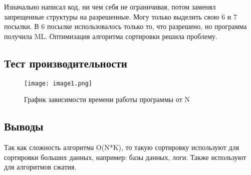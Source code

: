 \documentclass[12pt]{article}
\begin{document}
Изначально написал код, ни чем себя не ограничивая, потом заменял запрещенные структуры на разрешенные. Могу только выделить свою 6 и 7 посылки. В 6 посылке использовалось только то, что разрешено, но программа получила ML. Оптимизация алгоритма сортировки решила проблему.

\subsection*{Тест производительности}

\begin{figure}[H]
    \centering
    \texttt{[image: image1.png]}
    \caption{График зависимости времени работы программы от N}
    \label{fig:graph}
\end{figure}

\subsection*{Выводы}

Так как сложность алгоритма O(N*K), то такую сортировку используют для сортировки больших данных, например: базы данных, логи. Также используют для алгоритмов сжатия.
\end{document}
